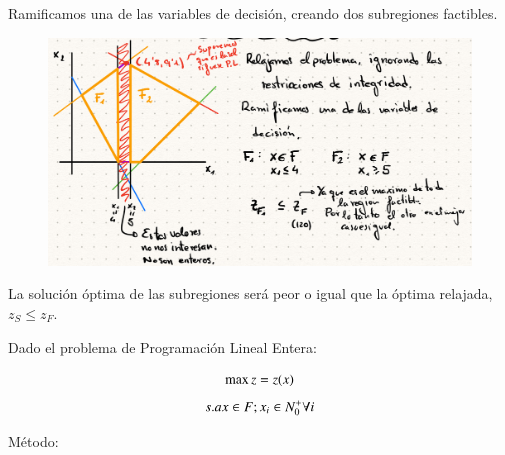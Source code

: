 \documentclass[12pt, twoside, openright]{report} %
\begin{document}
  Ramificamos una de las variables de decisión, creando dos
    subregiones factibles.
	\begin{figure}[H]
		{\includegraphics[scale=.25]{Untitled 19.png}}
	\end{figure}
	\vspace{-0.5cm}

  La solución óptima de las subregiones será peor o igual que la óptima
  relajada, \(z_S \leq z_F\).

    Dado el problema de Programación Lineal Entera:
	\vspace{-0.5cm}

	$$\max \space z= z(x)$$
	\vspace{-1cm}
    $$s.a \space x \in F; x_i \in N^+_0 \space \forall i$$

	Método:
	\vspace{-0.5cm}
\end{document}
